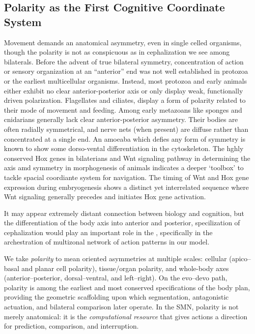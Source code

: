 
\subsection{Polarity as the First Cognitive Coordinate System}
\label{subsec:polarity}
Movement demands an anatomical asymmetry, even in single celled organisms, though the polarity is not as conspicuous as in cephalization we see among bilaterals.  Before the advent of true bilateral symmetry, concentration of action or sensory organization at an “anterior” end was not well established in protozoa or the earliest multicellular organisms. Instead, most protozoa and early animals either exhibit no clear anterior-posterior axis or only display weak, functionally driven polarization.   Flagellates and ciliates, display a form of polarity related to their mode of movement and feeding. Among early metazoans like sponges and cnidarians generally lack clear anterior-posterior asymmetry. Their bodies are often radially symmetrical, and nerve nets (when present) are diffuse rather than concentrated at a single end.\cite{MANUEL2009polarity} An amoeaba which defies any form of symmetry is known to show some dorso-vental differentiation in the cytoskeleton\cite{Taniguchi2023AmoebaMembrane}.  The hghly conserved Hox genes in bilaterians and Wnt signaling pathway in determining the axis amd symmetry in morphogenesis of animals\cite{DiMaio2015WntSymmetry} indicates a deeper `toolbox' to tackle spacial coordiante system for navigation.  The timing of Wnt and Hox gene expression during embryogenesis shows a distinct yet interrelated sequence where Wnt signaling generally precedes and initiates Hox gene activation.  

It may appear extremely distant connection between biology and cognition, but the differentiation of the body axis into anterior and posterior, specilization of cephalization would play an important role in the \SMND, specifically in the archestration of multizonal network of action patterns in our model. 

We take \emph{polarity} to mean oriented asymmetries at multiple scales: cellular (apico--basal and planar cell polarity), tissue/organ polarity, and whole-body axes (anterior--posterior, dorsal--ventral, and left--right).
On the evo--devo path, polarity is among the earliest and most conserved specifications of the body plan, providing the geometric scaffolding upon which segmentation, antagonistic actuation, and bilateral comparison later operate.
In the SMN, polarity is not merely anatomical: it is the \emph{computational resource} that gives actions a direction for prediction, comparison, and interruption.

